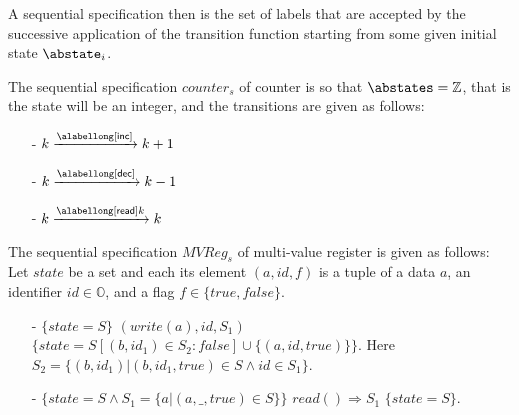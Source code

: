 A sequential specification then is the set of labels that are accepted
by the successive application of the transition function starting from
some given initial state $\abstate_{i}$.

\begin{example}
\label{definition:sequential specification of counter}
The sequential specification $\mathit{counter}_s$ of counter is so
that $\abstates = \mathbb{Z}$, that is the state will be an integer,
and the transitions are given as follows:
\begin{itemize}
\setlength{\itemsep}{0.5pt}
\item[-] $k \xrightarrow{\alabellong[\mathsf{inc}]{}{}} k+1$
\item[-] $k \xrightarrow{\alabellong[\mathsf{dec}]{}{}} k-1$
\item[-] $k \xrightarrow{\alabellong[\mathsf{read}]{}{k}} k$
\end{itemize}
\end{example}


\begin{example}
\label{def:spec-MVR}
The sequential specification $\mathit{MVReg}_s$ of multi-value
register is given as follows: Let $\mathit{state}$ be a set and each
its element $(a,\mathit{id},f)$ is a tuple of a data $a$, an
identifier $\mathit{id} \in \mathbb{O}$, and a flag $f \in \{
\mathit{true},\mathit{false} \}$.
\begin{itemize}
\setlength{\itemsep}{0.5pt}
\item[-] $\{ \mathit{state} = S \}$ $(write(a),\mathit{id},S_1)$ $\{
  \mathit{state} = S[(b,\mathit{id}_1) \in S_2 : \mathit{false}] \cup
  \{ (a,id,\mathit{true}) \} \}$. Here $S_2 = \{ (b,\mathit{id}_1)
  \vert (b,\mathit{id}_1,\mathit{true}) \in S \wedge id \in S_1 \}$.
\item[-] $\{ \mathit{state} = S \wedge S_1 = \{ a \vert
  (a,\_,\mathit{true}) \in S \} \}$ $read() \Rightarrow S_1$ $\{
  \mathit{state} = S \}$.
\end{itemize}
\end{example}

